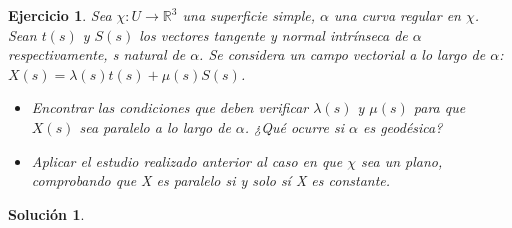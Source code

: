 \documentclass{article}
\theoremstyle{plain}
\newtheorem{exercise}{Ejercicio}
\newtheorem*{sol*}{Solución}
\newcommand{\R}{\mathbb{R}}
\newcommand{\X}{\chi}
\begin{document}
\newpage
\begin{exercise}
Sea $\X:U\rightarrow\R^3$ una superficie simple, $\alpha$ una curva regular en $\X$. Sean $t(s)$ y $S(s)$ los vectores tangente y normal intrínseca de $\alpha$ respectivamente, s natural de $\alpha$. Se considera un campo vectorial a lo largo de $\alpha$: $X(s)=\lambda(s)t(s)+\mu(s)S(s)$. 
\begin{itemize}
\item Encontrar las condiciones que deben verificar $\lambda(s)$ y $\mu(s)$ para que $X(s)$ sea paralelo a lo largo de $\alpha$. ¿Qué ocurre si $\alpha$ es geodésica?
\item Aplicar el estudio realizado anterior al caso en que $\X$ sea un plano, comprobando que X es paralelo si y solo sí X es constante.
\end{itemize}
\end{exercise}
\begin{sol*}
\end{sol*}
\end{document}
